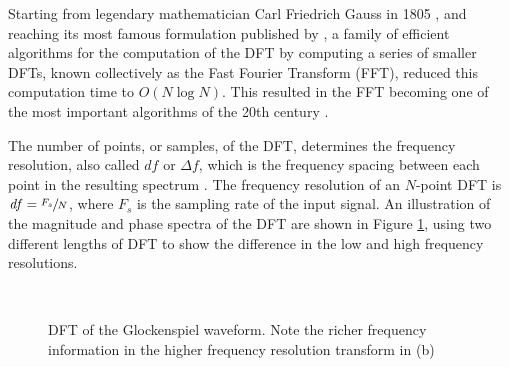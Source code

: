 \documentclass[report.tex]{subfiles}
\begin{document}
Starting from legendary mathematician Carl Friedrich Gauss in 1805 \parencite{gausshist}, and reaching its most famous formulation published by \textcite{cooleytukey}, a family of efficient algorithms for the computation of the DFT by computing a series of smaller DFTs, known collectively as the Fast Fourier Transform (FFT), reduced this computation time to $O(N \log{N})$. This resulted in the FFT becoming one of the most important algorithms of the 20th century \parencite{ffttopten}.

The number of points, or samples, of the DFT, determines the frequency resolution, also called $\mathit{df}$ or $\mathit{\Delta f}$, which is the frequency spacing between each point in the resulting spectrum \parencite{discretebook}. The frequency resolution of an $N$-point DFT is $\mathit{df} = \sfrac{F_{s}}{N}$, where $F_{s}$ is the sampling rate of the input signal. An illustration of the magnitude and phase spectra of the DFT are shown in Figure \ref{fig:glockdft}, using two different lengths of DFT to show the difference in the low and high frequency resolutions.

\begin{figure}[ht]
	\centering
	\\
	\caption{DFT of the Glockenspiel waveform. Note the richer frequency information in the higher frequency resolution transform in (b)}
	\label{fig:glockdft}
\end{figure}
\end{document}
